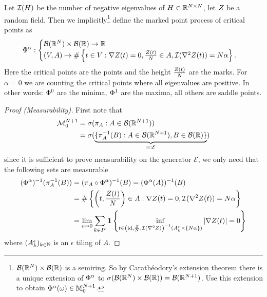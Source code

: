 \begin{definition}
	Let \(\negEV(H)\) be the number of negative eigenvalues of
	\(H\in\real^{\dimension\times\dimension}\), let \(\rf\) be a random field.
	Then we implicitly\footnote{
		\(\borel(\real^\dimension)\times\borel(\real)\) is a semiring. So by
		Carathéodory's extension theorem there is a unique extension of
		\(\crit^\alpha\) to
		\(\sigma(\borel(\real^\dimension)\times\borel(\real))=\borel(\real^{\dimension+1})\).
		Use this extension to obtain \(\crit^\alpha(\omega)\in\locFiniteMeasure[\dimension+1]\).
	} define the marked point process of critical points as
	\begin{align*}
		\crit^\alpha:
		\begin{cases}
			\borel(\real^\dimension)\times\borel(\real) \to \real\\
			(\Vol, A) \mapsto
			\#\left\{t\in\Vol:
				\nabla\rf(t)=0,
				\frac{\rf(t)}{\dimension}\in A,
				\negEV(\nabla^2 \rf(t))=\dimension\alpha
			\right\}.
		\end{cases}
	\end{align*}
	Here the critical points are the points and the height \(\frac{\rf(t)}\dimension\)
	are the marks. For \(\alpha=0\) we are counting the critical points where all
	eigenvalues are positive. In other words: \(\crit^0\) are the minima,
	\(\crit^1\) are the maxima, all others are saddle points.
\end{definition}
\begin{proof}[Proof (Measurability)]
	First note that	
	\begin{align*}
		\locFiniteMeasAlg[\dimension+1]
		&= \sigma(\pi_A : A\in\borel(\real^{\dimension+1}))\\
		&=\sigma(\underbrace{
			\{\pi_A^{-1}(B) : A\in\borel(\real^{\dimension+1}), B\in\borel(\real)\}
		}_{=:\mathcal{E}}
		)
	\end{align*}
	since it is sufficient to prove measurability on the generator
	\(\mathcal{E}\), we only need that the following sets are measurable
	\begin{align*}
		(\crit^\alpha)^{-1}(\pi^{-1}_{ A }(B))
		&= (\pi_{A} \circ \crit^\alpha)^{-1}(B)
		= (\crit^\alpha(A))^{-1}(B)\\
		&= \#\left\{\left(t,\frac{\rf(t)}{\dimension}\right) \in A:
			\nabla\rf(t)=0,
			\negEV(\nabla^2 \rf(t))=\dimension\alpha
		\right\}\\
		&= \lim_{\epsilon\to 0} \sum_{k\in I^\epsilon}
		\ind\left\{
			\inf_{t\in \left(\text{id}, \frac{\rf}\dimension, \negEV(\nabla^2\rf)\right)^{-1}(A^\epsilon_k\times \{\dimension\alpha\}) }
		|\nabla \rf(t)| = 0
		\right\}
	\end{align*}
	where \((A^\epsilon_k)_{k\in\nat}\) is an \(\epsilon\) tiling of \(A\).
\end{proof}

